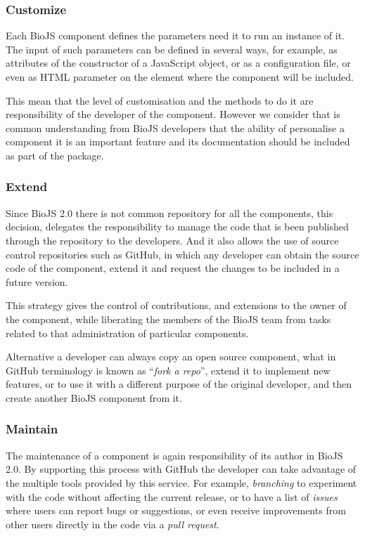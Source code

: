 \subsubsection{Customize}
Each BioJS component defines the parameters need it to run an instance of it. The input of such parameters can be defined in several ways, for example, as attributes of the constructor of a JavaScript object, or as a configuration file, or even as HTML parameter on the element where the component will be included.

This mean that the level of customisation and the methods to do it are responsibility of the developer of the component. However we consider that is common understanding from BioJS developers that the ability of personalise a component it is an important feature and its documentation should be included as part of the package.

\subsubsection{Extend}
Since BioJS 2.0 there is not common repository for all the components, this decision, delegates the responsibility to manage the code that is been published through the repository to the developers. And it also allows the use of source control repositories such as GitHub, in which any developer can obtain the source code of the component, extend it and request the changes to be included in a future version.

This strategy gives the control of contributions, and extensions to the owner of the component, while liberating the members of the BioJS team from tasks related to that administration of particular components.

Alternative a developer can always copy an open source component, what in GitHub terminology is known as ``\emph{fork a repo}'', extend it to implement new features, or to use it with a different purpose of the original developer, and then create another BioJS component from it.

\subsubsection{Maintain}
The maintenance of a component is again responsibility of its author in BioJS 2.0. By supporting this process with GitHub the developer can take advantage of the multiple tools provided by this service. For example, \emph{branching} to experiment with the code without affecting the current release, or to have a list of \emph{issues} where users can report bugs or suggestions, or even receive improvements from other users directly in the code via a \emph{pull request}.

